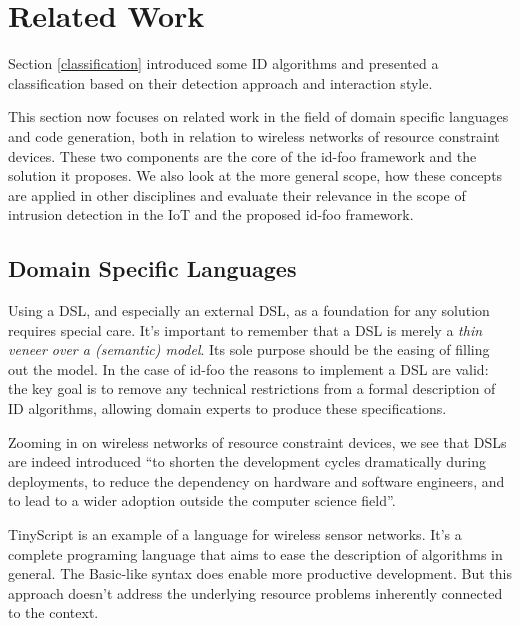 \documentclass[conference]{IEEEtran}
\newcommand{\NAME}{id-foo\xspace}
\begin{document}
\section{Related Work}
\label{related}

Section \ref{classification} introduced some ID
algorithms\cite{ganeriwal2008reputation,mishra2004intrusion,krontiris2009cooperative}
and presented a classification\cite{mishra2004intrusion,ioannis2007towards,alrajeh2013intrusion}
based on their detection approach and interaction style.

This section now focuses on related work in the field of domain specific
languages and code generation, both in relation to wireless networks of
resource constraint devices. These two components are the core of the \NAME
framework and the solution it proposes. We also look at the more general scope,
how these concepts are applied in other disciplines and evaluate their
relevance in the scope of intrusion detection in the IoT and the proposed \NAME
framework.

\subsection{Domain Specific Languages}

Using a DSL, and especially an external DSL, as a foundation for any solution
requires special care. It's important to remember that a DSL is merely a
\emph{thin veneer over a (semantic) model}\cite{fowler2010domain}. Its sole
purpose should be the easing of filling out the model. In the case of \NAME the
reasons to implement a DSL are valid: the key goal is to remove any technical
restrictions from a formal description of ID algorithms, allowing domain
experts to produce these specifications\cite{mernik2005and}.

Zooming in on wireless networks of resource constraint devices, we see that
DSLs are indeed introduced \enquote{to shorten the development cycles
dramatically during deployments, to reduce the dependency on hardware and
software engineers, and to lead to a wider adoption outside the computer
science field}\cite{sadilek2008domain,naumowicz2009prototyping}.

TinyScript\cite{levis2004tinyscript} is an example of a language for wireless
sensor networks. It's a complete programing language that aims to ease the
description of algorithms in general. The Basic-like syntax does enable more
productive development. But this approach doesn't address the underlying
resource problems inherently connected to the context.
\end{document}
